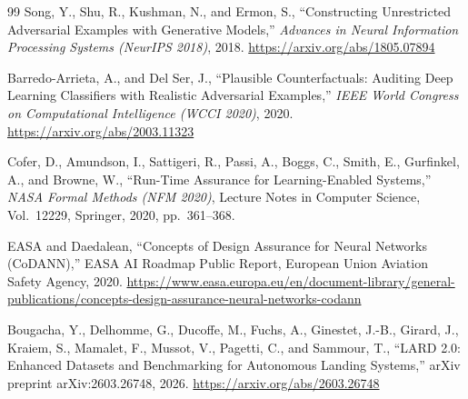 \documentclass[twocolumn,smallextended,runningheads]{svjour3}
\begin{document}
\begin{thebibliography}{99}
Song, Y., Shu, R., Kushman, N., and Ermon, S., ``Constructing Unrestricted Adversarial Examples with Generative Models,'' \emph{Advances in Neural Information Processing Systems (NeurIPS 2018)}, 2018. \url{https://arxiv.org/abs/1805.07894}

Barredo-Arrieta, A., and Del Ser, J., ``Plausible Counterfactuals: Auditing Deep Learning Classifiers with Realistic Adversarial Examples,'' \emph{IEEE World Congress on Computational Intelligence (WCCI 2020)}, 2020. \url{https://arxiv.org/abs/2003.11323}

Cofer, D., Amundson, I., Sattigeri, R., Passi, A., Boggs, C., Smith, E., Gurfinkel, A., and Browne, W., ``Run-Time Assurance for Learning-Enabled Systems,'' \emph{NASA Formal Methods (NFM 2020)}, Lecture Notes in Computer Science, Vol.~12229, Springer, 2020, pp.~361--368.

EASA and Daedalean, ``Concepts of Design Assurance for Neural Networks (CoDANN),'' EASA AI Roadmap Public Report, European Union Aviation Safety Agency, 2020. \url{https://www.easa.europa.eu/en/document-library/general-publications/concepts-design-assurance-neural-networks-codann}

Bougacha, Y., Delhomme, G., Ducoffe, M., Fuchs, A., Ginestet, J.-B., Girard, J., Kraiem, S., Mamalet, F., Mussot, V., Pagetti, C., and Sammour, T., ``LARD 2.0: Enhanced Datasets and Benchmarking for Autonomous Landing Systems,'' arXiv preprint arXiv:2603.26748, 2026. \url{https://arxiv.org/abs/2603.26748}

\end{thebibliography}
\end{document}
